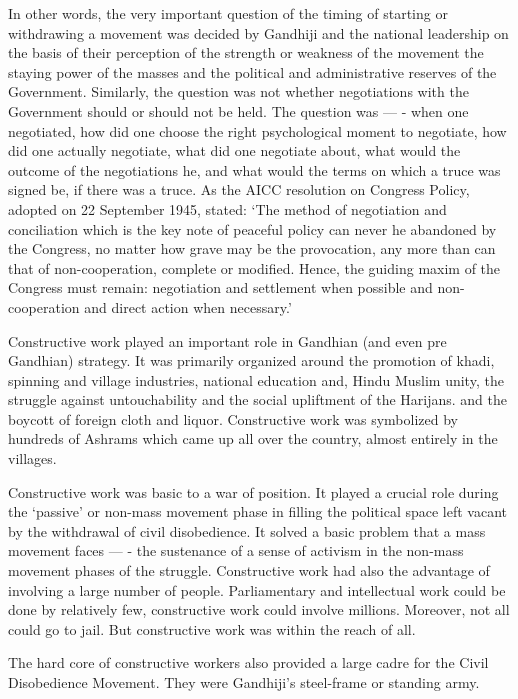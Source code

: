 In other words, the very important question of the timing of starting or withdrawing a movement was decided by Gandhiji and the national leadership on the basis of their perception of the strength or weakness of the movement the staying power of the masses and the political and administrative reserves of the Government. Similarly, the question was not whether negotiations with the Government should or should not be held. The question was --- - when one negotiated, how did one choose the right psychological moment to negotiate, how did one actually negotiate, what did one negotiate about, what would the outcome of the negotiations he, and what would the terms on which a truce was signed be, if there was a truce. As the AICC resolution on Congress Policy, adopted on 22 September 1945, stated: `The method of negotiation and conciliation which is the key note of peaceful policy can never he abandoned by the Congress, no matter how grave may be the provocation, any more than can that of non-cooperation, complete or modified. Hence, the guiding maxim of the Congress must remain: negotiation and settlement when possible and non-cooperation and direct action when necessary.'

Constructive work played an important role in Gandhian (and even pre Gandhian) strategy. It was primarily organized around the promotion of khadi, spinning and village industries, national education and, Hindu Muslim unity, the struggle against untouchability and the social upliftment of the Harijans. and the boycott of foreign cloth and liquor. Constructive work was symbolized by hundreds of Ashrams which came up all over the country, almost entirely in the villages.

Constructive work was basic to a war of position. It played a crucial role during the `passive' or non-mass movement phase in filling the political space left vacant by the withdrawal of civil disobedience. It solved a basic problem that a mass movement faces --- - the sustenance of a sense of activism in the non-mass movement phases of the struggle. Constructive work had also the advantage of involving a large number of people. Parliamentary and intellectual work could be done by relatively few, constructive work could involve millions. Moreover, not all could go to jail. But constructive work was within the reach of all.

The hard core of constructive workers also provided a large cadre for the Civil Disobedience Movement. They were Gandhiji's steel-frame or standing army.

